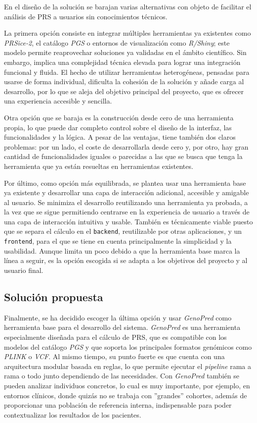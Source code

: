 En el diseño de la solución se barajan varias alternativas con objeto de facilitar el análisis de PRS a usuarios sin conocimientos técnicos. 

La primera opción consiste en integrar múltiples herramientas ya existentes como \textit{PRSice-2}, el catálogo \textit{PGS} o entornos de visualización como \textit{R/Shiny}; este modelo permite reaprovechar soluciones ya validadas en el ámbito científico. Sin embargo, implica una complejidad técnica elevada para lograr una integración funcional y fluida. El hecho de utilizar herramientas heterogéneas, pensadas para usarse de forma individual, dificulta la cohesión de la solución y añade carga al desarrollo, por lo que se aleja del objetivo principal del proyecto, que es ofrecer una experiencia accesible y sencilla. 

Otra opción que se baraja es la construcción desde cero de una herramienta propia, lo que puede dar completo control sobre el diseño de la interfaz, las funcionalidades y la lógica. A pesar de las ventajas, tiene también dos claros problemas: por un lado, el coste de desarrollarla desde cero y, por otro, hay gran cantidad de funcionalidades iguales o parecidas a las que se busca que tenga la herramienta que ya están resueltas en herramientas existentes. 

Por último, como opción más equilibrada, se plantea usar una herramienta base ya existente y desarrollar una capa de interacción adicional, accesible y amigable al usuario. Se minimiza el desarrollo reutilizando una herramienta ya probada, a la vez que se sigue permitiendo centrarse en la experiencia de usuario a través de una capa de interacción intuitiva y usable. También es técnicamente viable puesto que se separa el cálculo en el \texttt{backend}, reutilizable por otras aplicaciones, y un \texttt{frontend}, para el que se tiene en cuenta principalmente la simplicidad y la usabilidad. Aunque limita un poco debido a que la herramienta base marca la línea a seguir, es la opción escogida si se adapta a los objetivos del proyecto y al usuario final.

\subsection{Solución propuesta}

Finalmente, se ha decidido escoger la última opción y usar \textit{GenoPred} como herramienta base para el desarrollo del sistema. \textit{GenoPred} es una herramienta especialmente diseñada para el cálculo de PRS, que es compatible con los modelos del catálogo \textit{PGS} y que soporta los principales formatos genómicos como \textit{PLINK} o \textit{VCF}. Al mismo tiempo, su punto fuerte es que cuenta con una arquitectura modular basada en reglas, lo que permite ejecutar el \textit{pipeline} rama a rama o todo junto dependiendo de las necesidades. Con \textit{GenoPred} también se pueden analizar individuos concretos, lo cual es muy importante, por ejemplo, en entornos clínicos, donde quizás no se trabaja con ''grandes'' cohortes, además de proporcionar una población de referencia interna, indispensable para poder contextualizar los resultados de los pacientes. 


